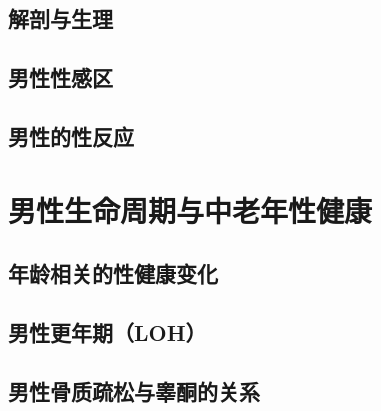 \section{解剖与生理}

\section{男性性感区}

\section{男性的性反应}


\chapter{男性生命周期与中老年性健康}

\section{年龄相关的性健康变化}

\section{男性更年期（LOH）}

\section{男性骨质疏松与睾酮的关系}


